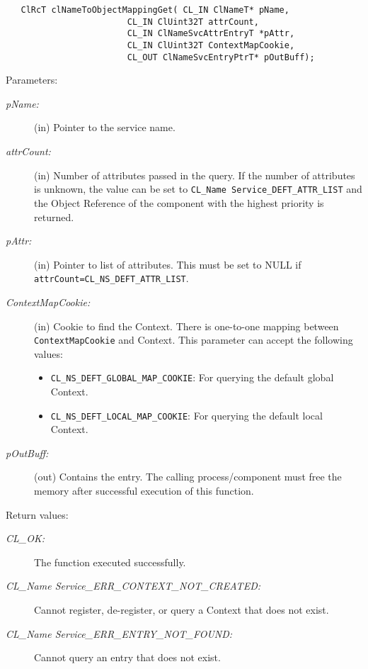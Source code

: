 \begin{flushleft}
\begin{Desc}
\footnotesize\begin{verbatim}   ClRcT clNameToObjectMappingGet( CL_IN ClNameT* pName, 
						CL_IN ClUint32T attrCount, 
						CL_IN ClNameSvcAttrEntryT *pAttr, 
						CL_IN ClUint32T ContextMapCookie, 
						CL_OUT ClNameSvcEntryPtrT* pOutBuff); 
\end{verbatim}
\normalsize
\end{Desc}
\begin{Desc}
\item[Parameters:]
\begin{description}
\item[{\em p\-Name:}](in) Pointer to the service name.
\item[{\em attr\-Count:}](in) Number of attributes passed in the query. If the number of attributes is unknown, the value can be set to 
{\tt{CL\_\-Name Service\_\-DEFT\_\-ATTR\_\-LIST}} and the Object Reference of the component with the highest priority is returned. 
\item[{\em p\-Attr:}](in) Pointer to list of attributes. This must be set to NULL if {\tt{attrCount=CL\_\-NS\_\-DEFT\_\-ATTR\_\-LIST}}. 
\item[{\em Context\-Map\-Cookie:}](in) Cookie to find the Context. There is one-to-one mapping between {\tt{ContextMapCookie}} and Context. This parameter can 
accept the following values: 
\begin{itemize}
\item
{\tt{CL\_\-NS\_\-DEFT\_\-GLOBAL\_\-MAP\_\-COOKIE}}: For querying the default global Context. 
\item
{\tt{CL\_\-NS\_\-DEFT\_\-LOCAL\_\-MAP\_\-COOKIE}}: For querying the default local Context.  
\end{itemize}
\item[{\em p\-Out\-Buff:}](out) Contains the entry. The calling process/component must free the memory after successful execution of this function. 
\end{description}
\end{Desc}
\begin{Desc}
\item[Return values:]
\begin{description}
\item[{\em CL\_\-OK:}]The function executed successfully. 
\item[{\em CL\_\-Name Service\_\-ERR\_\-CONTEXT\_\-NOT\_\-CREATED:}]Cannot register, de-register, or query a Context that does not exist.
\item[{\em CL\_\-Name Service\_\-ERR\_\-ENTRY\_\-NOT\_\-FOUND:}]Cannot query an entry that does not exist.

\end{description}
\end{Desc}
\end{flushleft}
